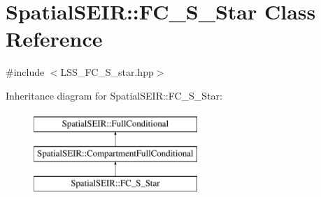 \hypertarget{classSpatialSEIR_1_1FC__S__Star}{\section{Spatial\-S\-E\-I\-R\-:\-:F\-C\-\_\-\-S\-\_\-\-Star Class Reference}
\label{classSpatialSEIR_1_1FC__S__Star}
}


{\ttfamily \#include $<$L\-S\-S\-\_\-\-F\-C\-\_\-\-S\-\_\-star.\-hpp$>$}

Inheritance diagram for Spatial\-S\-E\-I\-R\-:\-:F\-C\-\_\-\-S\-\_\-\-Star\-:\begin{figure}[H]
\begin{center}
\leavevmode
\includegraphics[height=3.000000cm]{classSpatialSEIR_1_1FC__S__Star}
\end{center}
\end{figure}
